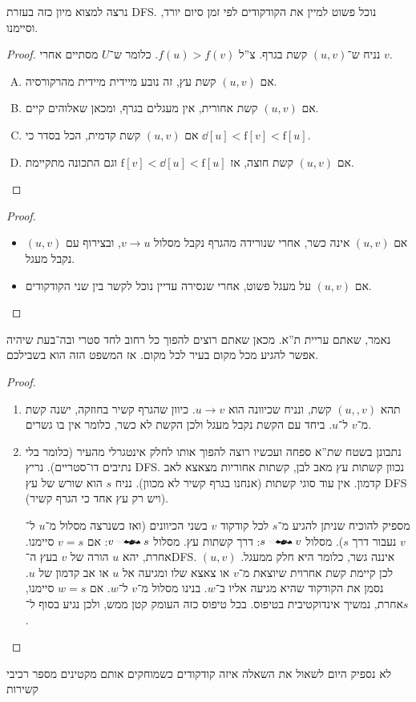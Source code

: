 \documentclass[]{../../../../tex/classes/styledArticle}
\newcommand\ff{\mathrm{f}}
\begin{document}
\begin{enumerate}
		נרצה למצוא מיון כזה בעזרת DFS. נוכל פשוט למיין את הקודקודים לפי זמן סיום יורד, וסיימנו. \begin{proof}
			נניח ש־$(u, v)$ קשת  בגרף. צ''ל $f(u) > f(v)$. כלומר ש־$U$ מסתיים אחרי $v$. 
			\begin{enumerate}[A.]
				\item אם $(u, v)$ קשת עץ, זה נובע מיידית מיידית מהרקורסיה. 
				\item אם $(u, v)$ קשת אחורית, אין מעגלים בגרף, ומכאן שאלוהים קיים. 
				\item אם $(u, v)$ קשת קדמית, הכל בסדר כי $\dd[u] < \ff[v] < \ff[u]$. 
				\item אם $(u, v)$ קשת חוצה, אז $\ff[v] < \dd[u] < \ff[u]$ וגם התכונה מתקיימת. 
			\end{enumerate}\envendproof
		\end{proof}
	\end{enumerate}
	
	\begin{proof}
		\begin{itemize}
			\item[$\implies$]אם $(u, v)$ אינה כשר, אחרי שנורידה מהגרף נקבל מסלול $v \to u$, ובצירוף עם $(u, v)$ נקבל מעגל. 
			\item[$\impliedby$]אם $(u, v)$ על מעגל פשוט, אחרי שנסירה עדיין נוכל לקשר בין שני הקודקודים. 
		\end{itemize}\envendproof
	\end{proof}
	נאמר, שאתם עריית ת''א. מכאן שאתם רוצים להפוך כל רחוב לחד סטרי ובה־בעת שיהיה אפשר להגיע מכל מקום בעיר לכל מקום. אז המשפט הזה הוא בשבילכם. 
	\begin{proof}
		\begin{enumerate}
			\item[$\impliedby$]תהא $(u, ,v)$ קשת, ונניח שכיוונה הוא $u \to v$. כיוון שהגרף קשיר בחוזקה, ישנה קשת מ־$v$ ל־$u$. ביחד עם הקשת נקבל מעגל ולכן הקשת לא כשר, כלומר אין בו גשרים. 
			\item[$\implies$]נתבונן בשטח שת''א ספחה ועכשיו רוצה להפוך אותו לחלק אינטגרלי מהעיר (כלומר בלי נתיבים דו־סטריים). נריץ DFS. נכוון קשתות עץ מאב לבן, קשתות אחוריות מצאצא לאב קדמון. אין עוד סוגי קשתות (אנחנו בגרף קשיר לא מכוון). נניח $s$ הוא שורש של עץ DFS (ויש רק עץ אחד כי הגרף קשיר). 
			
			מספיק להוכיח שניתן להגיע מ־$s$ לכל קודקוד $v$ בשני הכיוונים (ואז כשנרצה מסלול מ־$u$ ל־$v$ נעבור דרך $s$). מסלול $s \xrightflutteringbat{} v$: דרך קשתות עץ. מסלול $v \xrightflutteringbat{} s$: אם $v = s$ סיימנו. אחרת, יהא $u$ הורה של $v$ בעץ ה־DFS. $(u, v)$ איננה גשר, כלומר היא חלק ממעגל. לכן קיימת קשת אחרוית שיוצאת מ־$v$ או צאצא שלו ומגיעה אל $u$ או אב קדמון של $u$. נסמן את הקודקוד שהיא מגיעה אליו ב־$w$. בנינו מסלול מ־$v$ ל־$w$. אם $w = s$ סיימנו, אחרת, נמשיך אינדוקטיבית בטיפוס. בכל טיפוס כזה העומק קטן ממש, ולכן נגיע בסוף ל־$s$. 
		\end{enumerate}\envendproof
	\end{proof}
	לא נספיק היום לשאול את השאלה איזה קודקודים כשמוחקים אותם מקטינים מספר רכיבי קשירות
	
	
	
	
	
	\ndoc
\end{document}

